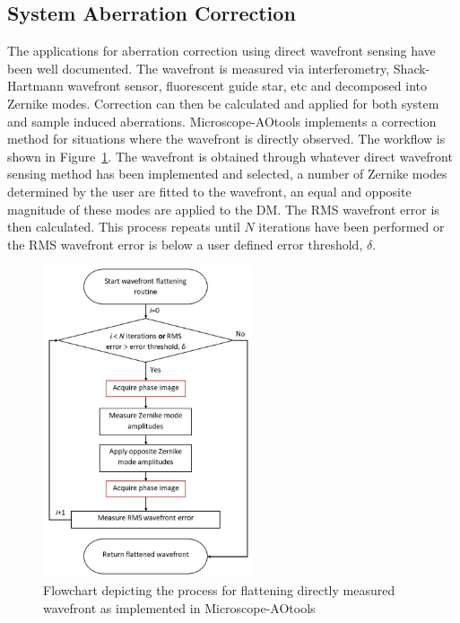 \subsection{System Aberration Correction}
\label{subsec:system_correction}

The applications for aberration correction using direct wavefront sensing have been well documented. The wavefront is measured via interferometry, Shack-Hartmann wavefront sensor, fluorescent guide star, etc and decomposed into Zernike modes. Correction can then be calculated and applied for both system and sample induced aberrations. Microscope-AOtools implements a correction method for situations where the wavefront is directly observed. The workflow is shown in Figure~\ref{fig:direct_wavefront_flattening_workflow}. The wavefront is obtained through whatever direct wavefront sensing method has been implemented and selected, a number of Zernike modes determined by the user are fitted to the wavefront, an equal and opposite magnitude of these modes are applied to the DM. The RMS wavefront error is then calculated. This process repeats until $N$ iterations have been performed or the RMS wavefront error is below a user defined error threshold, $\delta$.

\begin{figure}[h]
	\centering
	\includegraphics[width=0.55\textwidth, scale=0.5]{./images/direct_wavefront_flattening_workflow.jpg}
	\caption{Flowchart depicting the process for flattening directly measured wavefront as implemented in Microscope-AOtools}
	\label{fig:direct_wavefront_flattening_workflow}
\end{figure}

